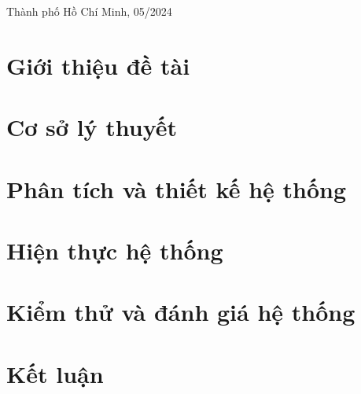 \documentclass[12pt]{report}
\begin{document}
\begin{titlepage}
	\vspace{3cm}
	\begin{center}
		{\footnotesize Thành phố Hồ Chí Minh, 05/2024}
	\end{center}
\end{titlepage}
\vspace{20cm}

\pagebreak

\pagebreak
\tableofcontents
\pagebreak
{}
\pagebreak
\makeatletter
\makeatother
\listoffigures
\pagebreak
\listoftables
\pagebreak
\printnoidxglossary[type=\acronymtype,title=Danh sách từ ngữ viết tắt]
\pagebreak


\chapter{Giới thiệu đề tài}

\newpage
\chapter{Cơ sở lý thuyết}

\newpage
\chapter{Phân tích và thiết kế hệ thống}

\newpage
\chapter{Hiện thực hệ thống}

\newpage
\chapter{Kiểm thử và đánh giá hệ thống}

\newpage
\chapter{Kết luận}

\newpage

\end{document}
